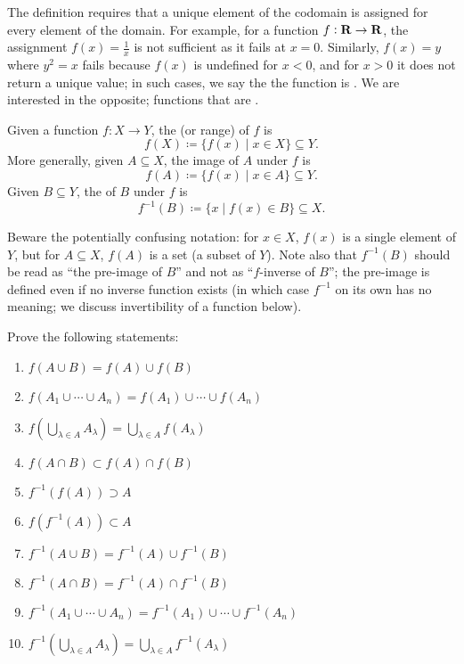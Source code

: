 \begin{remark}
The definition requires that a unique element of the codomain is assigned for every element of the domain. For example, for a function $f:\mathbf R \to \mathbf R$, the assignment $f(x)=\frac{1}{x}$ is not sufficient as it fails at $x=0$. Similarly, $f(x)=y$ where $y^2=x$ fails because $f(x)$ is undefined for $x<0$, and for $x>0$ it does not return a unique value; in such cases, we say the the function is . We are interested in the opposite; functions that are .
\end{remark}

\begin{definition}
Given a function $f:X \to Y$, the  (or range) of $f$ is
\[f(X)\coloneqq\{f(x)\mid x\in X\}\subseteq Y.\]
More generally, given $A \subseteq X$, the image of $A$ under $f$ is
\[f(A)\coloneqq\{f(x)\mid x\in A\}\subseteq Y.\]
Given $B \subseteq Y$, the  of $B$ under $f$ is
\[f^{-1}(B)\coloneqq\{x\mid f(x)\in B\}\subseteq X.\]
\end{definition}

\begin{remark}
Beware the potentially confusing notation: for $x \in X$, $f(x)$ is a single element of $Y$, but for $A \subseteq X$, $f(A)$ is a set (a subset of $Y$). Note also that $f^{-1}(B)$ should be read as ``the pre-image of $B$'' and not as ``$f$-inverse of $B$''; the pre-image is defined even if no inverse function exists (in which case $f^{-1}$ on its own has no meaning; we discuss invertibility of a function below).
\end{remark}

\begin{exercise}
Prove the following statements:
\begin{enumerate}[label=(\alph*)]
\item $f(A\cup B)=f(A)\cup f(B)$
\item $f(A_1\cup\cdots\cup A_n)=f(A_1)\cup\cdots\cup f(A_n)$
\item $f(\bigcup_{\lambda\in A}A_\lambda)=\bigcup_{\lambda\in A}f(A_\lambda)$
\item $f(A\cap B)\subset f(A)\cap f(B)$
\item $f^{-1}(f(A))\supset A$
\item $f(f^{-1}(A))\subset A$
\item $f^{-1}(A\cup B)=f^{-1}(A)\cup f^{-1}(B)$
\item $f^{-1}(A\cap B)=f^{-1}(A)\cap f^{-1}(B)$
\item $f^{-1}(A_1\cup\cdots\cup A_n)=f^{-1}(A_1)\cup\cdots\cup f^{-1}(A_n)$
\item $f^{-1}(\bigcup_{\lambda\in A}A_\lambda)=\bigcup_{\lambda\in A}f^{-1}(A_\lambda)$
\end{enumerate}
\end{exercise}


